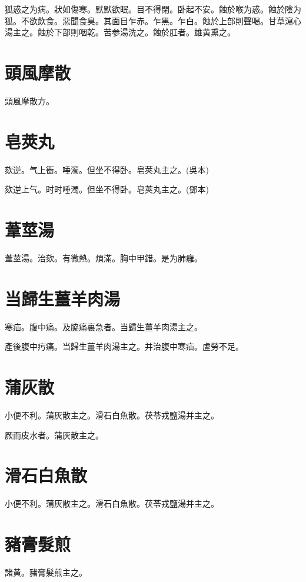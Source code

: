 \documentclass[b5paper,twoside,zihao=-4,UTF8]{ctexbook}
\begin{document}
狐惑之为病。狀如傷寒。默默欲眠。目不得閉。卧起不安。蝕於喉为惑。蝕於陰为狐。不欲飲食。惡聞食臭。其面目乍赤。乍黑。乍白。蝕於上部則聲喝。甘草瀉心湯主之。蝕於下部則咽乾。苦参湯洗之。蝕於肛者。雄黄熏之。

\section{頭風摩散}

頭風摩散方。

\section{皂莢丸}

欬逆。气上衝。唾濁。但坐不得卧。皂莢丸主之。(吳本)

欬逆上气。时时唾濁。但坐不得卧。皂莢丸主之。(鄧本)

\section{葦莖湯}

葦莖湯。治欬。有微熱。煩滿。胸中甲錯。是为肺癰。

\section{当歸生薑羊肉湯}

寒疝。腹中痛。及脇痛裏急者。当歸生薑羊肉湯主之。

產後腹中㽲痛。当歸生薑羊肉湯主之。并治腹中寒疝。虗勞不足。

\section{蒲灰散}

小便不利。蒲灰散主之。滑石白魚散。茯苓戎鹽湯并主之。

厥而皮水者。蒲灰散主之。

\section{滑石白魚散}

小便不利。蒲灰散主之。滑石白魚散。茯苓戎鹽湯并主之。

\section{豬膏髮煎}

諸黄。豬膏髮煎主之。
\end{document}
